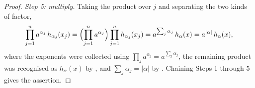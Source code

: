 \begin{proof}
\emph{Step 5: multiply.}
Taking the product over $j$ and separating the two kinds of factor,
\[
  \prod_{j=1}^n a^{\alpha_j}\, h_{\alpha_j}(x_j)
    = \Bigl(\prod_{j=1}^n a^{\alpha_j}\Bigr)
      \prod_{j=1}^n h_{\alpha_j}(x_j)
    = a^{\sum_{j} \alpha_j}\, h_\alpha(x)
    = a^{|\alpha|}\, h_\alpha(x),
\]
where the exponents were collected using $\prod_j a^{\alpha_j} = a^{\sum_j
\alpha_j}$, the remaining product was recognised as $h_\alpha(x)$ by
, and $\sum_j \alpha_j = |\alpha|$ by
.  Chaining Steps 1 through 5 gives the assertion.
\end{proof}
